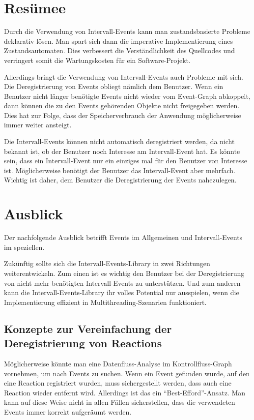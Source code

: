 \documentclass[article,colorback,accentcolor=tud4c]{tudreport}
\begin{document}



\section{Resümee}
Durch die Verwendung von Intervall-Events kann man zustandsbasierte
Probleme deklarativ lösen. Man spart sich dann die imperative Implementierung
eines Zustandsautomaten. Dies verbessert die Verständlichkeit des Quellcodes und
verringert somit die Wartungskosten für ein Software-Projekt. 

Allerdings bringt die Verwendung von Intervall-Events auch Probleme mit sich.
Die Deregistrierung von Events obliegt nämlich dem Benutzer. Wenn ein Benutzer
nicht länger benötigte Events nicht wieder vom Event-Graph abkoppelt, dann
können die zu den Events gehörenden Objekte nicht freigegeben werden. Dies hat
zur Folge, dass der Speicherverbrauch der Anwendung möglicherweise immer weiter
ansteigt. 

Die Intervall-Events können nicht automatisch deregistriert werden, da nicht
bekannt ist, ob der Benutzer noch Interesse am Intervall-Event hat. Es könnte
sein, dass ein Intervall-Event nur ein einziges mal für den Benutzer von
Interesse ist. Möglicherweise benötigt der Benutzer das Intervall-Event aber
mehrfach. Wichtig ist daher, dem Benutzer die Deregistrierung der Events
nahezulegen.

\section{Ausblick}
Der nachfolgende Ausblick betrifft Events im Allgemeinen und Intervall-Events im
speziellen.

Zukünftig sollte sich die Intervall-Events-Library in zwei Richtungen
weiterentwickeln. Zum einen ist es wichtig den Benutzer bei der Deregistrierung
von nicht mehr benötigten Intervall-Events zu unterstützen. Und zum anderen kann
die Intervall-Events-Library ihr volles Potential nur ausspielen, wenn
die Implementierung effizient in Multithreading-Szenarien funktioniert.

\subsection{Konzepte zur Vereinfachung der Deregistrierung von Reactions}

Möglicherweise könnte man eine Datenfluss-Analyse im Kontrollfluss-Graph
vornehmen, um nach Events zu suchen. Wenn ein Event gefunden wurde, auf den eine Reaction
registriert wurden, muss sichergestellt werden, dass auch eine Reaction wieder
entfernt wird. Allerdings ist das ein "`Best-Efford"'-Ansatz. Man kann auf diese
Weise nicht in allen Fällen sicherstellen, dass die verwendeten Events immer
korrekt aufgeräumt werden.
\end{document}
